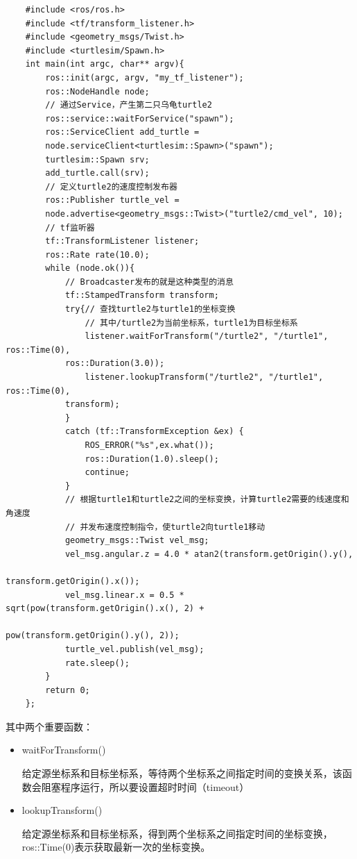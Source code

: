 \documentclass[10pt, oneside]{book}
\begin{document}
\begin{verbatim}
    #include <ros/ros.h>
    #include <tf/transform_listener.h>
    #include <geometry_msgs/Twist.h>
    #include <turtlesim/Spawn.h>
    int main(int argc, char** argv){
        ros::init(argc, argv, "my_tf_listener");
        ros::NodeHandle node;
        // 通过Service，产生第二只乌龟turtle2
        ros::service::waitForService("spawn");
        ros::ServiceClient add_turtle =
        node.serviceClient<turtlesim::Spawn>("spawn");
        turtlesim::Spawn srv;
        add_turtle.call(srv);
        // 定义turtle2的速度控制发布器
        ros::Publisher turtle_vel =
        node.advertise<geometry_msgs::Twist>("turtle2/cmd_vel", 10);
        // tf监听器
        tf::TransformListener listener;
        ros::Rate rate(10.0);
        while (node.ok()){
            // Broadcaster发布的就是这种类型的消息
            tf::StampedTransform transform;
            try{// 查找turtle2与turtle1的坐标变换
                // 其中/turtle2为当前坐标系，turtle1为目标坐标系
                listener.waitForTransform("/turtle2", "/turtle1", ros::Time(0), 
            ros::Duration(3.0));
                listener.lookupTransform("/turtle2", "/turtle1", ros::Time(0), 
            transform);
            }
            catch (tf::TransformException &ex) {
                ROS_ERROR("%s",ex.what());
                ros::Duration(1.0).sleep();
                continue;
            }
            // 根据turtle1和turtle2之间的坐标变换，计算turtle2需要的线速度和角速度
            // 并发布速度控制指令，使turtle2向turtle1移动
            geometry_msgs::Twist vel_msg;
            vel_msg.angular.z = 4.0 * atan2(transform.getOrigin().y(),
                                            transform.getOrigin().x());
            vel_msg.linear.x = 0.5 * sqrt(pow(transform.getOrigin().x(), 2) +
                                          pow(transform.getOrigin().y(), 2));
            turtle_vel.publish(vel_msg);
            rate.sleep();
        }
        return 0;
    };
\end{verbatim}

其中两个重要函数：
\begin{itemize}
    \item waitForTransform()
    
    给定源坐标系和目标坐标系，等待两个坐标系之间指定时间的变换关系，该函数会阻塞程序运行，所以要设置超时时间（timeout）

    \item lookupTransform()
    
    给定源坐标系和目标坐标系，得到两个坐标系之间指定时间的坐标变换，ros::Time(0)表示获取最新一次的坐标变换。
    
\end{itemize}
\end{document}
